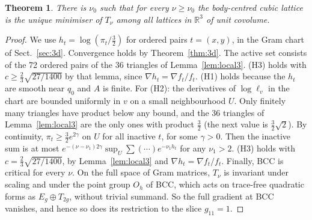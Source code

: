\documentclass[10pt,twocolumn,a4paper]{article}
\newtheorem{theorem}{Theorem}
\theoremstyle{definition}
\newcommand{\R}{\mathbb{R}}
\begin{document}
\begin{theorem}\label{thm:bcc}
There is $\nu_0$ such that for every $\nu\ge\nu_0$ the body-centred cubic lattice is the unique minimiser of $T_\nu$ among all lattices in $\R^3$ of unit covolume.
\end{theorem}
\begin{proof}
We use $h_t=\log(\pi_t/\frac32)$ for ordered pairs $t=(x,y)$, in the Gram chart of Sect.~\ref{sec:3d}. Convergence holds by Theorem~\ref{thm:3d}. The active set consists of the 72 ordered pairs of the 36 triangles of Lemma~\ref{lem:local3}. (H3) holds with $c\ge\frac23\sqrt{27/1400}$ by that lemma, since $\nabla h_t=\nabla f_t/f_t$. (H1) holds because the $h_t$ are smooth near $q_0$ and $A$ is finite. For (H2): the derivatives of $\log\ell_v$ in the chart are bounded uniformly in $v$ on a small neighbourhood $U$. Only finitely many triangles have product below any bound, and the 36 triangles of Lemma~\ref{lem:local3} are the only ones with product $\frac32$ (the next value is $\frac32\sqrt2$). By continuity, $\pi_t\ge\frac32e^{2\gamma}$ on $U$ for all inactive $t$, for some $\gamma>0$. Then the inactive sum is at most $e^{-(\nu-\nu_1)2\gamma}\sup_U\sum(\cdots)e^{-\nu_1h_t}$ for any $\nu_1>2$. (H3) holds with $c=\frac23\sqrt{27/1400}$, by Lemma~\ref{lem:local3} and $\nabla h_t=\nabla f_t/f_t$. Finally, BCC is critical for every $\nu$. On the full space of Gram matrices, $T_\nu$ is invariant under scaling and under the point group $O_h$ of BCC, which acts on trace-free quadratic forms as $E_g\oplus T_{2g}$, without trivial summand. So the full gradient at BCC vanishes, and hence so does its restriction to the slice $g_{11}=1$.
\end{proof}
\end{document}
